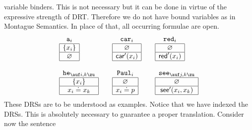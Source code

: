 variable binders. This is not necessary but it can be done in
virtue of the expressive strength of DRT. Therefore we do not
have bound variables as in Montague Semantics. In place of that,
all occurring formulae are open.
$$\begin{array}{l@{\qquad}l@{\qquad}l}
\begin{array}{|c|}
\multicolumn{1}{c}{\mbox{\tt a}_i} \\\hline
\{x_i\} \\\hline
\varnothing \\\hline
\end{array}
&
\begin{array}{|c|}
\multicolumn{1}{c}{\mbox{\tt car}_i} \\\hline
\varnothing \\\hline
\mbox{\sf car}'(x_i) \\\hline
\end{array}
&
\begin{array}{|c|}
\multicolumn{1}{c}{\mbox{\tt red}_i} \\\hline
\varnothing \\\hline
\mbox{\sf red}'(x_i) \\\hline
\end{array}
\\\\
\begin{array}{|c|}
\multicolumn{1}{c}{\mbox{\tt he}_{\auf i,k\zu}} \\\hline
\{x_i\} \\\hline
x_i \doteq x_k \\\hline
\end{array}
&
\begin{array}{|c|}
\multicolumn{1}{c}{\mbox{\tt Paul}_i} \\\hline
\varnothing \\\hline
x_i \doteq p \\\hline
\end{array}
 &
\begin{array}{|c|}
\multicolumn{1}{c}{\mbox{\tt see}_{\auf j,k\zu}} \\\hline
\varnothing  \\\hline
\mbox{\sf see}'(x_i,x_k) \\\hline
\end{array}
\end{array}$$
These DRSs are to be understood as examples. Notice that we have
indexed the DRSs. This is absolutely necessary to guarantee a
proper translation. Consider now the sentence
\\[2mm]

